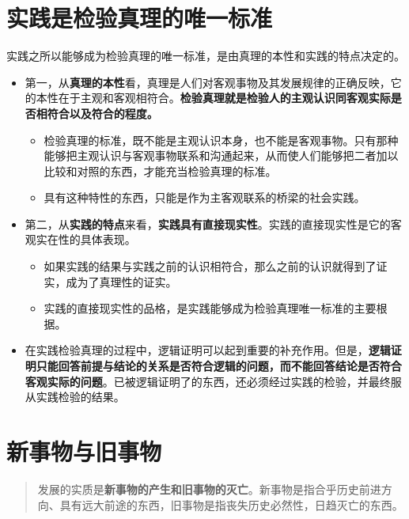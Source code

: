 \documentclass[
]{article}
\begin{document}
\hypertarget{ux5b9eux8df5ux662fux68c0ux9a8cux771fux7406ux7684ux552fux4e00ux6807ux51c6}{%
\section{实践是检验真理的唯一标准}\label{ux5b9eux8df5ux662fux68c0ux9a8cux771fux7406ux7684ux552fux4e00ux6807ux51c6}}

实践之所以能够成为检验真理的唯一标准，是由真理的本性和实践的特点决定的。

\begin{itemize}
\item
  第一，从\textbf{真理的本性}看，真理是人们对客观事物及其发展规律的正确反映，它的本性在于主观和客观相符合。\textbf{检验真理就是检验人的主观认识同客观实际是否相符合以及符合的程度。}

  \begin{itemize}
  \item
    检验真理的标准，既不能是主观认识本身，也不能是客观事物。只有那种能够把主观认识与客观事物联系和沟通起来，从而使人们能够把二者加以比较和对照的东西，才能充当检验真理的标准。
  \item
    具有这种特性的东西，只能是作为主客观联系的桥梁的社会实践。
  \end{itemize}
\item
  第二，从\textbf{实践的特点}来看，\textbf{实践具有直接现实性}。实践的直接现实性是它的客观实在性的具体表现。

  \begin{itemize}
  \item
    如果实践的结果与实践之前的认识相符合，那么之前的认识就得到了证实，成为了真理性的证实。
  \item
    实践的直接现实性的品格，是实践能够成为检验真理唯一标准的主要根据。
  \end{itemize}
\item
  在实践检验真理的过程中，逻辑证明可以起到重要的补充作用。但是，\textbf{逻辑证明只能回答前提与结论的关系是否符合逻辑的问题，而不能回答结论是否符合客观实际的问题}。已被逻辑证明了的东西，还必须经过实践的检验，并最终服从实践检验的结果。
\end{itemize}

\hypertarget{ux65b0ux4e8bux7269ux4e0eux65e7ux4e8bux7269}{%
\section{新事物与旧事物}\label{ux65b0ux4e8bux7269ux4e0eux65e7ux4e8bux7269}}

\begin{quote}
发展的实质是\textbf{新事物的产生和旧事物的灭亡}。新事物是指合乎历史前进方向、具有远大前途的东西，旧事物是指丧失历史必然性，日趋灭亡的东西。
\end{quote}
\end{document}

